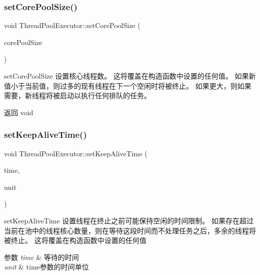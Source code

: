 \subsubsection{\texorpdfstring{set\+Core\+Pool\+Size()}{setCorePoolSize()}}
{\footnotesize\ttfamily void Thread\+Pool\+Executor\+::set\+Core\+Pool\+Size (\begin{DoxyParamCaption}\item[{int32\+\_\+t}]{core\+Pool\+Size }\end{DoxyParamCaption})}



set\+Core\+Pool\+Size 设置核心线程数。 这将覆盖在构造函数中设置的任何值。 如果新值小于当前值，则过多的现有线程在下一个空闲时将被终止。 如果更大，则如果需要，新线程将被启动以执行任何排队的任务。 

\begin{DoxyReturn}{返回}
void 
\end{DoxyReturn}
\mbox{\label{classThreadPoolExecutor_a08c40e5f4ae67709ae163e3a72eb4054}} 
\subsubsection{\texorpdfstring{set\+Keep\+Alive\+Time()}{setKeepAliveTime()}}
{\footnotesize\ttfamily void Thread\+Pool\+Executor\+::set\+Keep\+Alive\+Time (\begin{DoxyParamCaption}\item[{long}]{time,  }\item[{Time\+Unit}]{unit }\end{DoxyParamCaption})}



set\+Keep\+Alive\+Time 设置线程在终止之前可能保持空闲的时间限制。 如果存在超过当前在池中的线程核心数量，则在等待这段时间而不处理任务之后，多余的线程将被终止。 这将覆盖在构造函数中设置的任何值 


\begin{DoxyParams}{参数}
{\em time} & 等待的时间 \\
\hline
{\em unit} & time参数的时间单位 \\
\hline
\end{DoxyParams}
\mbox{\label{classThreadPoolExecutor_a83e9e3715fdacc5b2f08b563d39bb62b}} 
